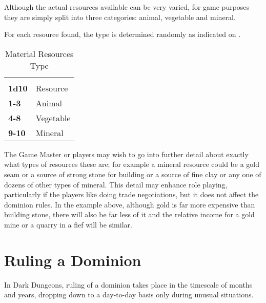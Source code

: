 \begin{multicols*}{2}
Although the actual resources available can be very varied, for game purposes they are simply split into three categories: animal, vegetable and mineral.

For each resource found, the type is determined randomly as indicated on .

\begin {table}[H]
  \caption{Material Resources Type}\label{tab:Material Resources Type}
  \begin{tabularx}{\columnwidth}{>{\bfseries}YY}
   & \\
	1d10 & Resource\\
	1-3 & Animal\\
	4-8 & Vegetable\\
	9-10 & Mineral
  \end {tabularx}
\end {table}

The Game Master or players may wish to go into further detail about exactly what types of resources these are; for example a mineral resource could be a gold seam or a source of strong stone for building or a source of fine clay or any one of dozens of other types of mineral. This detail may enhance role playing, particularly if the players like doing trade negotiations, but it does not affect the dominion rules. In the example above, although gold is far more expensive than building stone, there will also be far less of it and the relative income for a gold mine or a quarry in a fief will be similar.


\section{Ruling a Dominion}
In Dark Dungeons, ruling of a dominion takes place in the timescale of months and years, dropping down to a day-to-day basis only during unusual situations.


\end{multicols*}
